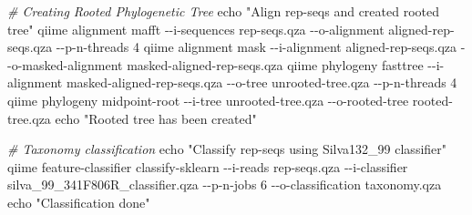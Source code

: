 \documentclass[
]{article}
\newenvironment{Shaded}{\begin{snugshade}}{\end{snugshade}}
\newcommand{\CommentTok}[1]{\textcolor[rgb]{0.56,0.35,0.01}{\textit{#1}}}
\newcommand{\DecValTok}[1]{\textcolor[rgb]{0.00,0.00,0.81}{#1}}
\newcommand{\NormalTok}[1]{#1}
\newcommand{\SpecialCharTok}[1]{\textcolor[rgb]{0.00,0.00,0.00}{#1}}
\newcommand{\StringTok}[1]{\textcolor[rgb]{0.31,0.60,0.02}{#1}}
\begin{document}
\begin{Shaded}
\begin{Highlighting}[]
\CommentTok{\# Creating Rooted Phylogenetic Tree}
\NormalTok{echo }\StringTok{"Align rep{-}seqs and created rooted tree"}
\NormalTok{qiime alignment mafft }\SpecialCharTok{{-}{-}}\NormalTok{i}\SpecialCharTok{{-}}\NormalTok{sequences rep}\SpecialCharTok{{-}}\NormalTok{seqs.qza }\SpecialCharTok{{-}{-}}\NormalTok{o}\SpecialCharTok{{-}}\NormalTok{alignment aligned}\SpecialCharTok{{-}}\NormalTok{rep}\SpecialCharTok{{-}}\NormalTok{seqs.qza }\SpecialCharTok{{-}{-}}\NormalTok{p}\SpecialCharTok{{-}}\NormalTok{n}\SpecialCharTok{{-}}\NormalTok{threads }\DecValTok{4}
\NormalTok{qiime alignment mask }\SpecialCharTok{{-}{-}}\NormalTok{i}\SpecialCharTok{{-}}\NormalTok{alignment aligned}\SpecialCharTok{{-}}\NormalTok{rep}\SpecialCharTok{{-}}\NormalTok{seqs.qza }\SpecialCharTok{{-}{-}}\NormalTok{o}\SpecialCharTok{{-}}\NormalTok{masked}\SpecialCharTok{{-}}\NormalTok{alignment masked}\SpecialCharTok{{-}}\NormalTok{aligned}\SpecialCharTok{{-}}\NormalTok{rep}\SpecialCharTok{{-}}\NormalTok{seqs.qza}
\NormalTok{qiime phylogeny fasttree }\SpecialCharTok{{-}{-}}\NormalTok{i}\SpecialCharTok{{-}}\NormalTok{alignment masked}\SpecialCharTok{{-}}\NormalTok{aligned}\SpecialCharTok{{-}}\NormalTok{rep}\SpecialCharTok{{-}}\NormalTok{seqs.qza }\SpecialCharTok{{-}{-}}\NormalTok{o}\SpecialCharTok{{-}}\NormalTok{tree unrooted}\SpecialCharTok{{-}}\NormalTok{tree.qza }\SpecialCharTok{{-}{-}}\NormalTok{p}\SpecialCharTok{{-}}\NormalTok{n}\SpecialCharTok{{-}}\NormalTok{threads }\DecValTok{4}
\NormalTok{qiime phylogeny midpoint}\SpecialCharTok{{-}}\NormalTok{root }\SpecialCharTok{{-}{-}}\NormalTok{i}\SpecialCharTok{{-}}\NormalTok{tree unrooted}\SpecialCharTok{{-}}\NormalTok{tree.qza }\SpecialCharTok{{-}{-}}\NormalTok{o}\SpecialCharTok{{-}}\NormalTok{rooted}\SpecialCharTok{{-}}\NormalTok{tree rooted}\SpecialCharTok{{-}}\NormalTok{tree.qza}
\NormalTok{echo }\StringTok{"Rooted tree has been created"}

\CommentTok{\# Taxonomy classification}
\NormalTok{echo }\StringTok{"Classify rep{-}seqs using Silva132\_99 classifier"}
\NormalTok{qiime feature}\SpecialCharTok{{-}}\NormalTok{classifier classify}\SpecialCharTok{{-}}\NormalTok{sklearn }\SpecialCharTok{{-}{-}}\NormalTok{i}\SpecialCharTok{{-}}\NormalTok{reads rep}\SpecialCharTok{{-}}\NormalTok{seqs.qza }\SpecialCharTok{{-}{-}}\NormalTok{i}\SpecialCharTok{{-}}\NormalTok{classifier silva\_99\_341F806R\_classifier.qza }\SpecialCharTok{{-}{-}}\NormalTok{p}\SpecialCharTok{{-}}\NormalTok{n}\SpecialCharTok{{-}}\NormalTok{jobs }\DecValTok{6} \SpecialCharTok{{-}{-}}\NormalTok{o}\SpecialCharTok{{-}}\NormalTok{classification taxonomy.qza}
\NormalTok{echo }\StringTok{"Classification done"}


\end{Highlighting}
\end{Shaded}
\end{document}
